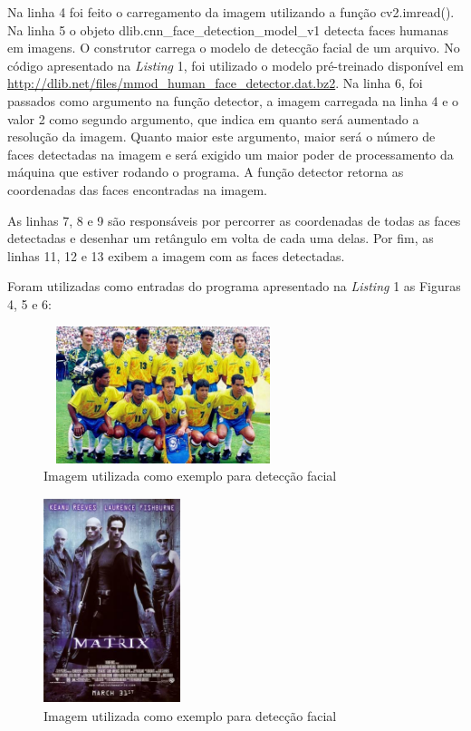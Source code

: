 \documentclass[conference]{IEEEtran}
\begin{document}
         Na linha 4 foi feito o carregamento da imagem utilizando a função cv2.imread(). Na linha 5 o objeto dlib.cnn\_face\_detection\_model\_v1 detecta faces humanas em imagens. O construtor carrega o modelo de detecção facial de um arquivo. No código apresentado na \textit{Listing} 1, foi utilizado o modelo pré-treinado disponível em \url{http://dlib.net/files/mmod\_human\_face\_detector.dat.bz2}. Na linha 6, foi passados como argumento na função detector, a imagem carregada na linha 4 e o valor 2 como segundo argumento, que indica em quanto será aumentado a resolução da imagem. Quanto maior este argumento, maior será o número de faces detectadas na imagem e será exigido um maior poder de processamento da máquina que estiver rodando o programa. A função detector retorna as coordenadas das faces encontradas na imagem.
         
         As linhas 7, 8 e 9 são responsáveis por percorrer as coordenadas de todas as faces detectadas e desenhar um retângulo em volta de cada uma delas. Por fim, as linhas 11, 12 e 13 exibem a imagem com as faces detectadas.
         
         Foram utilizadas como entradas do programa apresentado na \textit{Listing} 1 as Figuras 4, 5 e 6:
         
         \begin{figure}[h!b]
			\centering \includegraphics[width=7cm,height=4cm]{brasil_1994.jpg}
			\caption{Imagem utilizada como exemplo para detecção facial \cite{b5}} 
		\end{figure}
		
	    \begin{figure}[h!b]
			\centering \includegraphics[width=4cm,height=6cm]{matrix.jpg}
			\caption{Imagem utilizada como exemplo para detecção facial \cite{b6}} 
		\end{figure}
\end{document}
